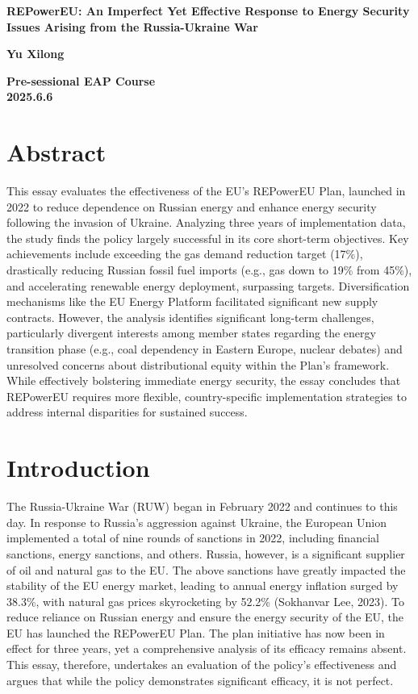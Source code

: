 \documentclass[12pt,a4paper]{article}
\newcommand{\maketitlepage}[3]{%
    \thispagestyle{empty}
    \begin{center}
        \vspace*{1cm}
        {\fontsize{24pt}{24pt}\bfseries #1\par}
        \vspace{12cm}
        {\fontsize{20pt}{20pt}\bfseries #2\par}
        \vspace{1cm}
        {\fontsize{20pt}{20pt}\bfseries #3\par}
    \end{center}
    \newpage
}
\begin{document}
\maketitlepage{REPowerEU: An Imperfect Yet Effective Response 
to Energy Security Issues Arising from the Russia-Ukraine War}
{Yu Xilong}{Pre-sessional EAP Course \\ 2025.6.6}

\tableofcontents
\clearpage

\section*{Abstract}
This essay evaluates the effectiveness of the EU's REPowerEU Plan, launched in 2022 to reduce dependence on Russian energy and enhance energy security following the invasion of Ukraine.
Analyzing three years of implementation data, the study finds the policy largely successful in its core short-term objectives. Key achievements include exceeding the gas demand reduction target (17\%),
drastically reducing Russian fossil fuel imports (e.g., gas down to 19\% from 45\%), and accelerating renewable energy deployment, surpassing targets. Diversification mechanisms like the EU Energy 
Platform facilitated significant new supply contracts. However, the analysis identifies significant long-term challenges, particularly divergent interests among member states regarding the energy 
transition phase (e.g., coal dependency in Eastern Europe, nuclear debates) and unresolved concerns about distributional equity within the Plan's framework. While effectively bolstering immediate 
energy security, the essay concludes that REPowerEU requires more flexible, country-specific implementation strategies to address internal disparities for sustained success.
\vspace{1\baselineskip} %


\section{Introduction}
The Russia-Ukraine War (RUW) began in February 2022 and continues to this day. In response to Russia's aggression against Ukraine, the European Union implemented a total of nine rounds of sanctions in 
2022, including financial sanctions, energy sanctions, and others. Russia, however, is a significant supplier of oil and natural gas to the EU. The above sanctions have greatly impacted the stability 
of the EU energy market, leading to annual energy inflation surged by 38.3\%, with natural gas prices skyrocketing by 52.2\% (Sokhanvar Lee, 2023). To reduce reliance on Russian energy and ensure 
the energy security of the EU, the EU has launched the REPowerEU Plan. The plan initiative has now been in effect for three years, yet a comprehensive analysis of its efficacy remains absent. This 
essay, therefore, undertakes an evaluation of the policy's effectiveness and argues that while the policy demonstrates significant efficacy, it is not perfect.
\end{document}
